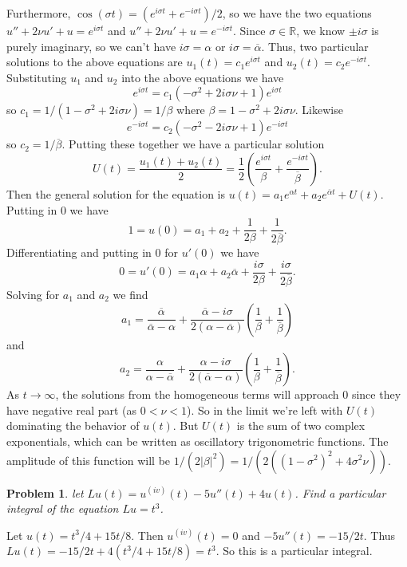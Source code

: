 \documentclass{article}
\newtheorem{problem}{Problem}
\begin{document}
Furthermore, $\cos(\sigma t) = (e^{i \sigma t} + e^{-i \sigma t})/2$, so we have the two equations $u'' + 2 \nu u' + u = e^{i \sigma t}$ and $u'' + 2 \nu u' + u = e^{-i \sigma t}$. Since $\sigma \in \mathbb{R}$, we know $\pm i \sigma$ is purely imaginary, so we can't have $i \sigma = \alpha$ or $i \sigma = \overline{\alpha}$. Thus, two particular solutions to the above equations are $u_1(t) = c_1 e^{i \sigma t}$ and $u_2(t) = c_2 e^{-i \sigma t}$. Substituting $u_1$ and $u_2$ into the above equations we have
\[
e^{i \sigma t} = c_1 ( - \sigma^2 + 2 i \sigma \nu + 1)e^{i \sigma t}
\]
so $c_1 = 1/(1 - \sigma^2 + 2 i \sigma \nu) = 1/\beta$ where $\beta = 1 - \sigma^2 + 2i \sigma \nu$. Likewise
\[
e^{-i \sigma t} = c_2 ( - \sigma^2 - 2 i \sigma \nu + 1)e^{-i \sigma t}
\]
so $c_2 = 1/\overline{\beta}$. Putting these together we have a particular solution
\[
U(t) = \frac{u_1(t) + u_2(t)}{2} = \frac{1}{2} \left ( \frac{e^{i \sigma t}}{\beta} + \frac{e^{-i \sigma t}}{\overline{\beta}} \right ).
\]
Then the general solution for the equation is $u(t) = a_1 e^{\alpha t} + a_2 e^{\overline{\alpha} t} + U(t)$. Putting in $0$ we have
\[
1 = u(0) = a_1 + a_2 + \frac{1}{2 \beta} + \frac{1}{2 \overline{\beta}}.
\]
Differentiating and putting in $0$ for $u'(0)$ we have
\[
0 = u'(0) = a_1 \alpha + a_2 \overline{\alpha} + \frac{i \sigma}{2 \beta} + \frac{i \sigma}{2 \overline{\beta}}.
\]
Solving for $a_1$ and $a_2$ we find
\[
a_1 = \frac{\overline{\alpha}}{\overline{\alpha} - \alpha} + \frac{\overline{\alpha} - i \sigma}{2(\alpha - \overline{\alpha})} \left ( \frac{1}{\beta} + \frac{1}{\overline{\beta}} \right )
\]
and
\[
a_2 = \frac{\alpha}{\alpha - \overline{\alpha}} + \frac{\alpha - i \sigma}{2(\overline{\alpha} - \alpha)} \left ( \frac{1}{\beta} + \frac{1}{\overline{\beta}} \right ).
\]
As $t \rightarrow \infty$, the solutions from the homogeneous terms will approach $0$ since they have negative real part (as $0 < \nu < 1$). So in the limit we're left with $U(t)$ dominating the behavior of $u(t)$. But $U(t)$ is the sum of two complex exponentials, which can be written as oscillatory trigonometric functions. The amplitude of this function will be $1/(2|\beta|^2) = 1/(2((1-\sigma^2)^2 + 4 \sigma^2 \nu))$.

\begin{problem}
let $Lu(t) = u^{(iv)}(t) - 5u''(t) + 4u(t)$. Find a particular integral of the equation $Lu = t^3$.
\end{problem}

Let $u(t) = t^3/4 + 15t/8$. Then $u^{(iv)}(t) = 0$ and $-5u''(t) = -15/2 t$. Thus $Lu(t) = -15/2t + 4(t^3/4 + 15t/8) = t^3$. So this is a particular integral.
\end{document}
